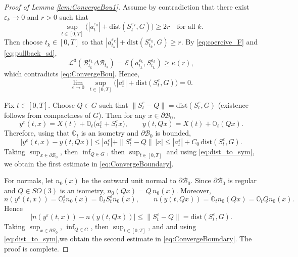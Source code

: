 \documentclass[11pt,twoside,reqno]{amsart}
\numberwithin{equation}{section}
\numberwithin{figure}{section}
\begin{document}
\begin{proof}[Proof of Lemma \ref{lem:ConvergeBou1}]
Assume by contradiction that there exist $\varepsilon_k\to0$ and $r>0$ such that
\[
\sup_{t\in[0,T]}\Big(|a_t^{\varepsilon_k}|+\mathrm{dist}(S_t^{\varepsilon_k},G)\Big)\ge 2r
\quad\text{for all }k.
\]
Then choose $t_k\in[0,T]$ so that
$|a_{t_k}^{\varepsilon_k}|+\mathrm{dist}(S_{t_k}^{\varepsilon_k},G)\ge r$.
By \eqref{eq:coercive_F} and \eqref{eq:pullback_sd},
\[
\mathcal{L}^3(\mathcal{B}_{t_k}^{\varepsilon_k}\Delta\mathcal{B}_{t_k})
=\mathcal{E}(a_{t_k}^{\varepsilon_k},S_{t_k}^{\varepsilon_k})
\ge \kappa(r),
\]
which contradicts \eqref{eq:ConvergeBou}. Hence,
\begin{equation}\label{eq:dist_to_sym}
\lim_{\varepsilon\to0}\ \sup_{t\in[0,T]}
\Big(|a_t^\varepsilon|+\mathrm{dist}(S_t^\varepsilon,G)\Big)=0.
\end{equation}


Fix $t\in[0,T]$. Choose $Q\in G$ such that
$\|S_t^\varepsilon-Q\|=\mathrm{dist}(S_t^\varepsilon,G)$ (existence follows from compactness of $G$).
Then for any $x\in\partial\mathcal{B}_0$,
\[
y^\varepsilon(t,x)=X(t)+\mathbb{O}_t\big(a_t^\varepsilon+S_t^\varepsilon x\big),
\qquad
y(t,Qx)=X(t)+\mathbb{O}_t(Qx).
\]
Therefore, using that $\mathbb{O}_t$ is an isometry and $\partial\mathcal{B}_0$ is bounded,
\[
|y^\varepsilon(t,x)-y(t,Qx)|
\le |a_t^\varepsilon|+\|S_t^\varepsilon-Q\|\,|x|
\le |a_t^\varepsilon|+C_0\,\mathrm{dist}(S_t^\varepsilon,G).
\]
Taking $\sup_{x\in\partial \mathcal{B}_0}$, then $\inf_{Q\in G}$, then $\sup_{t\in[0,T]}$ and using \eqref{eq:dist_to_sym},
we obtain the first estimate in \eqref{eq:ConvergeBoundary}.

For normals, let $n_0(x)$ be the outward unit normal to $\partial\mathcal{B}_0$. Since
$\partial\mathcal{B}_0$ is regular and $Q\in SO(3)$ is an isometry, $n_0(Qx)=Q\,n_0(x)$.
Moreover,
\[
n(y^\varepsilon(t,x))=\mathbb{O}_t^\varepsilon n_0(x)=\mathbb{O}_t S_t^\varepsilon n_0(x),
\qquad
n(y(t,Qx))=\mathbb{O}_t n_0(Qx)=\mathbb{O}_t Q n_0(x).
\]
Hence
\[
|n(y^\varepsilon(t,x))-n(y(t,Qx))|
\le \|S_t^\varepsilon-Q\|
=\mathrm{dist}(S_t^\varepsilon,G).
\]
Taking $\sup_{x\in\partial \mathcal{B}_0}$, $\inf_{Q\in G}$, then $\sup_{t\in[0,T]}$, and and using \eqref{eq:dist_to_sym},we obtain the second estimate in
\eqref{eq:ConvergeBoundary}. The proof is complete.
\end{proof}




	
\end{document}
